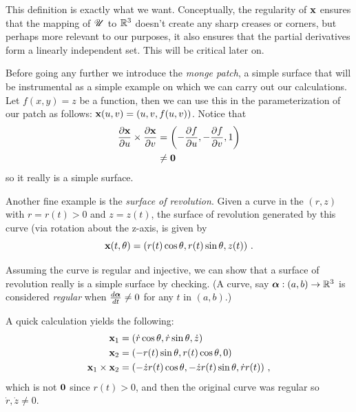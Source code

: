 This definition is exactly what we want. Conceptually, the regularity of $\mathbf{x}$ ensures that the mapping of $\mathscr{U}$ to $\mathbb{R}^3$ doesn't create any sharp creases or corners, but perhaps more relevant to our purposes, it also ensures that the partial derivatives form a linearly independent set. This will be critical later on.

\begin{ex} %
  Before going any further we introduce the \emph{monge patch}, a simple surface that will be instrumental as a simple example on which we can carry out our calculations. Let $f(x, y) = z$ be a function, then we can use this in the parameterization of our patch as follows: $\mathbf{x}(u, v) = (u, v, f(u, v))$. Notice that
  \begin{align*}
    \frac{\partial\mathbf{x}}{\partial u} \times \frac{\partial\mathbf{x}}{\partial v} &= \left(-\frac{\partial f}{\partial u}, -\frac{\partial f}{\partial v}, 1\right)\\
    &\neq \mathbf{0}
  \end{align*}
  so it really is a simple surface.
\end{ex}

\begin{ex} %
  \label{ex:revolution}
  Another fine example is the \emph{surface of revolution}. Given a curve in the $(r, z)$ with $r = r(t) > 0$ and $z = z(t)$, the surface of revolution generated by this curve (via rotation about the z-axis, is given by
  \[
    \mathbf{x}(t, \theta) = (r(t)\cos\theta, r(t)\sin\theta, z(t)) \ .
  \]

  Assuming the curve is regular and injective, we can show that a surface of revolution really is a simple surface by checking. (A curve, say $\boldsymbol{\alpha} : (a, b) \to \mathbb{R}^3$ is considered \emph{regular} when $\frac{d\boldsymbol{\alpha}}{dt} \neq 0$ for any $t$ in $(a, b)$.)

  A quick calculation yields the following:
  \begin{align*}
    \mathbf{x}_1 &= (\dot{r}\cos{\theta}, \dot{r}\sin{\theta}, \dot{z})\\
    \mathbf{x}_2 &= (-r(t)\sin{\theta}, r(t)\cos{\theta}, 0)\\
    \mathbf{x}_1 \times \mathbf{x}_2 &= (-\dot{z} r(t) \cos{\theta}, -\dot{z} r(t) \sin{\theta}, \dot{r}r(t)) \ ,
  \end{align*}
  which is not $\mathbf{0}$ since $r(t) > 0$, and then the original curve was regular so $\dot{r}, \dot{z} \neq 0$.
\end{ex}

